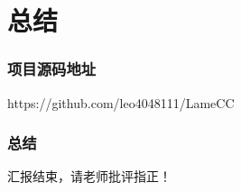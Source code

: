 \section{总结}
\begin{frame}
    \frametitle{项目源码地址}
    \footnotesize
    {https://github.com/leo4048111/LameCC}
\end{frame}

\begin{frame}
    \frametitle{总结}
    \footnotesize
    {汇报结束，请老师批评指正！}
\end{frame}